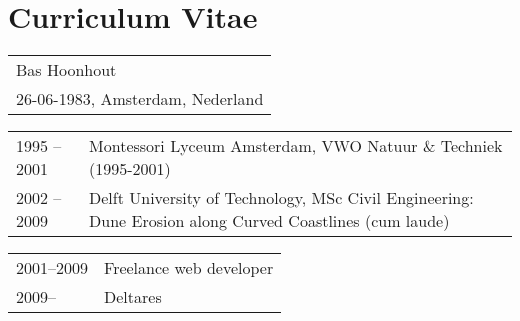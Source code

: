 \chapter*{Curriculum Vitae}

\noindent {}

\begin{table}[h]
  \def\arraystretch{1.5}
  \begin{tabular}{p{10cm}}
    Bas Hoonhout \\
    26-06-1983, Amsterdam, Nederland \\
  \end{tabular}
\end{table}

\noindent {}

\begin{table}[h]
  \def\arraystretch{1.5}
  \begin{tabular}{p{1.6cm} p{10cm}}
    1995 -- 2001 & Montessori Lyceum Amsterdam, VWO Natuur \& Techniek (1995-2001) \\
    2002 -- 2009 & Delft University of Technology, MSc Civil Engineering: Dune Erosion along Curved Coastlines (cum laude) \\
  \end{tabular}
\end{table}

\noindent {}

\begin{table}[h]
  \def\arraystretch{1.5}
  \begin{tabular}{p{1.6cm} p{10cm}}
    2001--2009 & Freelance web developer \\
    2009-- & Deltares \\
  \end{tabular}
\end{table}

